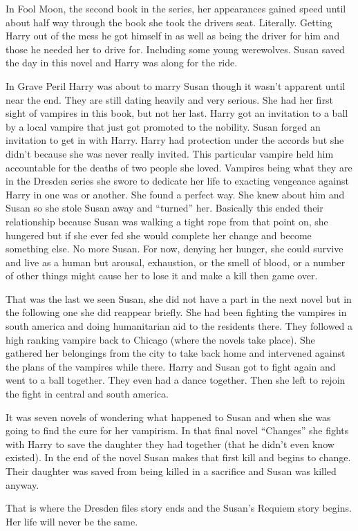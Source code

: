 \documentclass[12pt,twoside,onecolumn,openright,extrafontsizes]{memoir}
\begin{document}
{In Fool Moon, the second book in the series, her appearances gained speed until about half way through the book she took the drivers seat. Literally. Getting Harry out of the mess he got himself in as well as being the driver for him and those he needed her to drive for. Including some young werewolves. Susan saved the day in this novel and Harry was along for the ride.

In Grave Peril Harry was about to marry Susan though it wasn't apparent until near the end. They are still dating heavily and very serious. She had her first sight of vampires in this book, but not her last. Harry got an invitation to a ball by a local vampire that just got promoted to the nobility. Susan forged an invitation to get in with Harry. Harry had protection under the accords but she didn't because she was never really invited. This particular vampire held him accountable for the deaths of two people she loved. Vampires being what they are in the Dresden series she swore to dedicate her life to exacting vengeance against Harry in one was or another. She found a perfect way. She knew about him and Susan so she stole Susan away and ``turned'' her. Basically this ended their relationship because Susan was walking a tight rope from that point on, she hungered but if she ever fed she would complete her change and become something else. No more Susan. For now, denying her hunger, she could survive and live as a human but arousal, exhaustion, or the smell of blood, or a number of other things might cause her to lose it and make a kill then game over.

That was the last we seen Susan, she did not have a part in the next novel but in the following one she did reappear briefly. She had been fighting the vampires in south america and doing humanitarian aid to the residents there. They followed a high ranking vampire back to Chicago (where the novels take place). She gathered her belongings from the city to take back home and intervened against the plans of the vampires while there. Harry and Susan got to fight again and went to a ball together. They even had a dance together. Then she left to rejoin the fight in central and south america.

It was seven novels of wondering what happened to Susan and when she was going to find the cure for her vampirism. In that final novel ``Changes'' she fights with Harry to save the daughter they had together (that he didn't even know existed). In the end of the novel Susan makes that first kill and begins to change. Their daughter was saved from being killed in a sacrifice and Susan was killed anyway.

That is where the Dresden files story ends and the Susan's Requiem story begins. Her life will never be the same.
}
		
\end{document}
